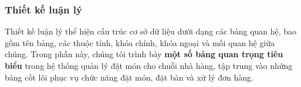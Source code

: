 





\subsubsection{Thiết kế luận lý}

Thiết kế luận lý thể hiện cấu trúc cơ sở dữ liệu dưới dạng các bảng quan hệ, bao gồm tên bảng, các thuộc tính, khóa chính, khóa ngoại và mối quan hệ giữa chúng. Trong phần này, chúng tôi trình bày \textbf{một số bảng quan trọng tiêu biểu} trong hệ thống quản lý đặt món cho chuỗi nhà hàng, tập trung vào những bảng cốt lõi phục vụ chức năng đặt món, đặt bàn và xử lý đơn hàng.

